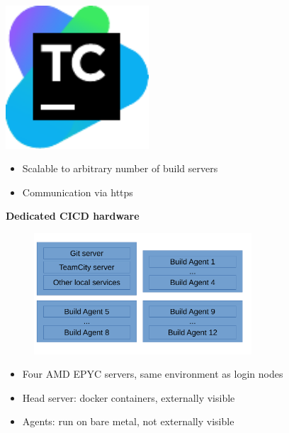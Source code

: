 \documentclass[english,11pt]{beamer}
\begin{document}
\begin{frame}
\begin{minipage}{0.45\textwidth}
        \includegraphics[width=0.4\textwidth]{logos/teamcity.pdf}
        \end{minipage}

\vfill
\begin{itemize}
 \item Scalable to arbitrary number of build servers
 \item Communication via https
\end{itemize}




\end{frame}

\begin{frame}
\textbf{Dedicated CICD hardware}
 \begin{figure}[H]
	\centering
    {\includegraphics[width=3.2in]{diagrams/hardware.pdf}}
\end{figure}

\begin{itemize}
 \item Four AMD EPYC servers, same environment  as login nodes
 \item Head server: docker containers, externally visible
 \item Agents: run on bare metal, not externally visible
\end{itemize}

\end{frame}
\end{document}

